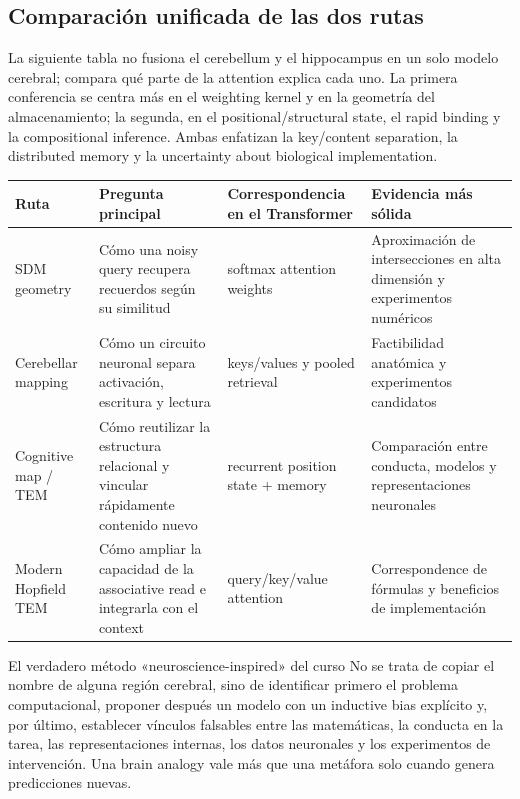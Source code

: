 \documentclass[a4paper]{article}
\begin{document}
\subsection{Comparación unificada de las dos rutas}

La siguiente tabla no fusiona el cerebellum y el hippocampus en un solo modelo cerebral; compara qué parte de la attention explica cada uno. La primera conferencia se centra más en el weighting kernel y en la geometría del almacenamiento; la segunda, en el positional/structural state, el rapid binding y la compositional inference. Ambas enfatizan la key/content separation, la distributed memory y la uncertainty about biological implementation.

\begin{longtable}{@{}L{0.18\textwidth}L{0.24\textwidth}L{0.25\textwidth}L{0.21\textwidth}@{}}
\toprule
Ruta & Pregunta principal & Correspondencia en el Transformer & Evidencia más sólida \\
\midrule
SDM geometry & Cómo una noisy query recupera recuerdos según su similitud & softmax attention weights & Aproximación de intersecciones en alta dimensión y experimentos numéricos \\
Cerebellar mapping & Cómo un circuito neuronal separa activación, escritura y lectura & keys/values y pooled retrieval & Factibilidad anatómica y experimentos candidatos \\
Cognitive map / TEM & Cómo reutilizar la estructura relacional y vincular rápidamente contenido nuevo & recurrent position state + memory & Comparación entre conducta, modelos y representaciones neuronales \\
Modern Hopfield TEM & Cómo ampliar la capacidad de la associative read e integrarla con el context & query/key/value attention & Correspondence de fórmulas y beneficios de implementación \\
\bottomrule
\end{longtable}

\begin{importantbox}{El verdadero método «neuroscience-inspired» del curso}
No se trata de copiar el nombre de alguna región cerebral, sino de identificar primero el problema computacional, proponer después un modelo con un inductive bias explícito y, por último, establecer vínculos falsables entre las matemáticas, la conducta en la tarea, las representaciones internas, los datos neuronales y los experimentos de intervención. Una brain analogy vale más que una metáfora solo cuando genera predicciones nuevas.
\end{importantbox}
\end{document}
